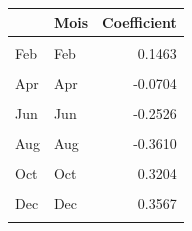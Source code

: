 \centering
\centering
\begin{tabular}[t]{llr}
\toprule
  & Mois & Coefficient\\
\midrule
\cellcolor{gray!10}{Jan} & \cellcolor{gray!10}{Jan} & \cellcolor{gray!10}{0.0610}\\
Feb & Feb & 0.1463\\
\cellcolor{gray!10}{Mar} & \cellcolor{gray!10}{Mar} & \cellcolor{gray!10}{0.0381}\\
Apr & Apr & -0.0704\\
\cellcolor{gray!10}{May} & \cellcolor{gray!10}{May} & \cellcolor{gray!10}{-0.2028}\\
Jun & Jun & -0.2526\\
\cellcolor{gray!10}{Jul} & \cellcolor{gray!10}{Jul} & \cellcolor{gray!10}{-0.2754}\\
Aug & Aug & -0.3610\\
\cellcolor{gray!10}{Sep} & \cellcolor{gray!10}{Sep} & \cellcolor{gray!10}{-0.1760}\\
Oct & Oct & 0.3204\\
\cellcolor{gray!10}{Nov} & \cellcolor{gray!10}{Nov} & \cellcolor{gray!10}{0.4157}\\
Dec & Dec & 0.3567\\
\cellcolor{gray!10}{} & \cellcolor{gray!10}{Somme} & \cellcolor{gray!10}{0.0000}\\
\bottomrule
\end{tabular}

